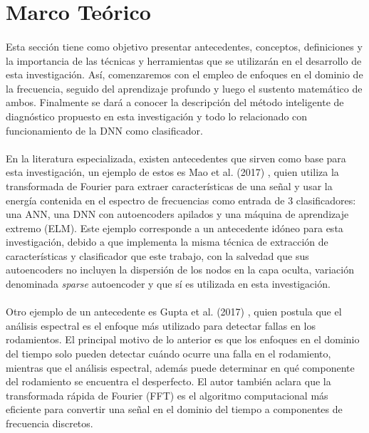 \documentclass[12pt]{article}%
\begin{document}
\section{Marco Teórico}
\paragraph{}
Esta sección tiene como objetivo presentar antecedentes, conceptos, definiciones y la importancia de las técnicas y herramientas que se utilizarán en el desarrollo de esta investigación. Así, comenzaremos con el empleo de enfoques en el dominio de la frecuencia, seguido del aprendizaje profundo y luego el sustento matemático de ambos. Finalmente se dará a conocer la descripción del método inteligente de diagnóstico propuesto en esta investigación y todo lo relacionado con funcionamiento de la DNN como clasificador.

\paragraph{}
En la literatura especializada, existen antecedentes que sirven como base para esta investigación, un ejemplo de estos es Mao et al. (2017) \cite{mao}, quien utiliza la transformada de Fourier para extraer características de una señal y usar la energía contenida en el espectro de frecuencias como entrada de 3 clasificadores: una ANN,  una DNN con autoencoders apilados y una máquina de aprendizaje extremo (ELM). Este ejemplo corresponde a un  antecedente idóneo para esta investigación, debido a que implementa la misma técnica de extracción de características y clasificador que este trabajo, con la salvedad que sus autoencoders no incluyen la dispersión de los nodos en la capa oculta, variación denominada \textit{sparse} autoencoder y que sí es utilizada en esta investigación.

\paragraph{}
Otro ejemplo de un antecedente es Gupta et al. (2017) \cite{kanpaj}, quien postula que el análisis espectral es el enfoque más utilizado para detectar fallas en los rodamientos. El principal motivo de lo anterior es que los enfoques en el dominio del tiempo solo pueden detectar cuándo ocurre una falla en el rodamiento, mientras que el análisis espectral, además puede determinar en qué componente del rodamiento se encuentra el desperfecto. El autor también aclara que la transformada rápida de Fourier (FFT) es el algoritmo computacional más eficiente para convertir una señal en el dominio del tiempo a componentes de frecuencia discretos.
\end{document}
